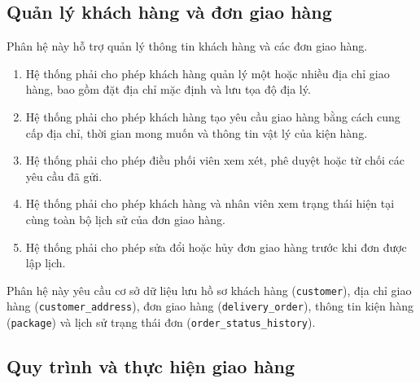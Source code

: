 \subsection{Quản lý khách hàng và đơn giao hàng}

Phân hệ này hỗ trợ quản lý thông tin khách hàng và các đơn giao hàng.
\begin{enumerate}
    \item Hệ thống phải cho phép khách hàng quản lý một hoặc nhiều địa chỉ giao hàng, bao gồm đặt địa chỉ mặc định và lưu tọa độ địa lý.
    \item Hệ thống phải cho phép khách hàng tạo yêu cầu giao hàng bằng cách cung cấp địa chỉ, thời gian mong muốn và thông tin vật lý của kiện hàng.
    \item Hệ thống phải cho phép điều phối viên xem xét, phê duyệt hoặc từ chối các yêu cầu đã gửi.
    \item Hệ thống phải cho phép khách hàng và nhân viên xem trạng thái hiện tại cùng toàn bộ lịch sử của đơn giao hàng.
    \item Hệ thống phải cho phép sửa đổi hoặc hủy đơn giao hàng trước khi đơn được lập lịch.
\end{enumerate}
Phân hệ này yêu cầu cơ sở dữ liệu lưu hồ sơ khách hàng (\texttt{customer}), địa chỉ giao hàng (\texttt{customer\_address}), đơn giao hàng (\texttt{delivery\_order}), thông tin kiện hàng (\texttt{package}) và lịch sử trạng thái đơn (\texttt{order\_status\_history}).

\subsection{Quy trình và thực hiện giao hàng}

